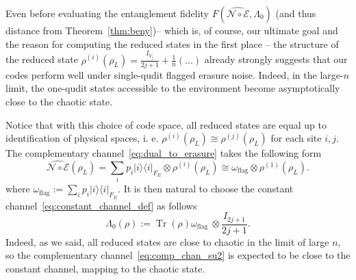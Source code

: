 \documentclass[10pt,twocolumn,superscriptaddress,aps,amsmath,amssymb,citeautoscript,floatfix,prx,longbibliography]{revtex4-2}
\theoremstyle{plain}
\theoremstyle{plain}
\theoremstyle{plain}
\theoremstyle{plain}
\theoremstyle{plain}
\theoremstyle{plain}
\begin{document}
Even before evaluating the entanglement fidelity $F(\widehat{\mathcal{N} \circ \mathcal{E}}, \Lambda_0)$ (and thus distance from Theorem~\ref{thm:beny})-- which is, of course, our ultimate goal and the reason for computing the reduced states in the first place -- the structure of the reduced state $\rho^{(i)}(\rho_L)=\frac{I_{V_j}}{2 j+1}+\frac{1}{n}(...)$ already strongly suggests that our codes perform well under single-qudit flagged erasure noise. Indeed, in the large-$n$ limit, the one-qudit states accessible to the environment become asymptotically close to the chaotic state. 

Notice that with this choice of code space, all reduced states are equal up to identification of physical spaces, i. e. $\rho^{(i)}(\rho_L)\cong \rho^{(j)}(\rho_L)$ for each site $i, j$. The complementary channel~\eqref{eq:dual_to_erasure} takes the following form
\begin{equation}\label{eq:comp_chan_su2}
    \widehat{\mathcal{N}\circ \mathcal{E}}(\rho_L)=\sum_i p_i|i\rangle\langle i|_{F_E} \otimes \rho^{(i)}(\rho_L) \cong \omega_{\text{flag}}\otimes \rho^{(1)}(\rho_L).
\end{equation}
where $\omega_{\text{flag}}:=\sum_i p_i|i\rangle\langle i|_{F_E}$. It is then natural to choose the constant channel~\eqref{eq:constant_channel_def} as follows
\[
    \Lambda_0(\rho):=\operatorname{Tr}(\rho) \omega_{\text {flag }} \otimes \frac{I_{2 j+1}}{2 j+1}.
\]
Indeed, as we said, all reduced states are close to chaotic in the limit of large $n$, so the complementary channel~\eqref{eq:comp_chan_su2} is expected to be close to the constant channel, mapping to the chaotic state.
\end{document}

